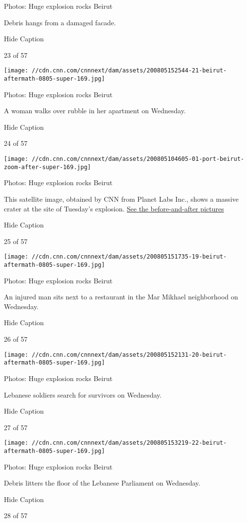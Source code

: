 Photos: Huge explosion rocks Beirut

Debris hangs from a damaged facade.

Hide Caption

23 of 57

\texttt{[image: //cdn.cnn.com/cnnnext/dam/assets/200805152544-21-beirut-aftermath-0805-super-169.jpg]}

Photos: Huge explosion rocks Beirut

A woman walks over rubble in her apartment on Wednesday.

Hide Caption

24 of 57

\texttt{[image: //cdn.cnn.com/cnnnext/dam/assets/200805104605-01-port-beirut-zoom-after-super-169.jpg]}

Photos: Huge explosion rocks Beirut

This satellite image, obtained by CNN from Planet Labs Inc., shows a
massive crater at the site of Tuesday's explosion.
\href{https://www.cnn.com/2020/08/05/world/satellite-images-beirut-explosion-before-after-trnd/index.html}{See
the before-and-after pictures}

Hide Caption

25 of 57

\texttt{[image: //cdn.cnn.com/cnnnext/dam/assets/200805151735-19-beirut-aftermath-0805-super-169.jpg]}

Photos: Huge explosion rocks Beirut

An injured man sits next to a restaurant in the Mar Mikhael neighborhood
on Wednesday.

Hide Caption

26 of 57

\texttt{[image: //cdn.cnn.com/cnnnext/dam/assets/200805152131-20-beirut-aftermath-0805-super-169.jpg]}

Photos: Huge explosion rocks Beirut

Lebanese soldiers search for survivors on Wednesday.

Hide Caption

27 of 57

\texttt{[image: //cdn.cnn.com/cnnnext/dam/assets/200805153219-22-beirut-aftermath-0805-super-169.jpg]}

Photos: Huge explosion rocks Beirut

Debris litters the floor of the Lebanese Parliament on Wednesday.

Hide Caption

28 of 57

